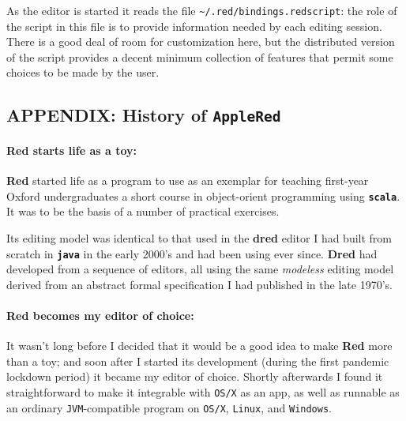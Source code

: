 \documentclass[
]{article}
\begin{document}
As the editor is started it reads the file
\texttt{\textasciitilde{}/.red/bindings.redscript}: the role of the
script in this file is to provide information needed by each editing
session. There is a good deal of room for customization here, but the
distributed version of the script provides a decent minimum collection
of features that permit some choices to be made by the user.

\hypertarget{appendix-history-of-applered}{%
\subsection{\texorpdfstring{APPENDIX: History of
\texttt{AppleRed}}{APPENDIX: History of AppleRed}}\label{appendix-history-of-applered}}

\hypertarget{red-starts-life-as-a-toy}{%
\paragraph{Red starts life as a toy:}\label{red-starts-life-as-a-toy}}

\textbf{Red} started life as a program to use as an exemplar for
teaching first-year Oxford undergraduates a short course in
object-orient programming using \textbf{\texttt{scala}}. It was to be
the basis of a number of practical exercises.

Its editing model was identical to that used in the \textbf{dred} editor
I had built from scratch in \textbf{\texttt{java}} in the early 2000's
and had been using ever since. \textbf{Dred} had developed from a
sequence of editors, all using the same \emph{modeless} editing model
derived from an abstract formal specification I had published in the
late 1970's.

\hypertarget{red-becomes-my-editor-of-choice}{%
\paragraph{Red becomes my editor of
choice:}\label{red-becomes-my-editor-of-choice}}

It wasn't long before I decided that it would be a good idea to make
\textbf{Red} more than a toy; and soon after I started its development
(during the first pandemic lockdown period) it became my editor of
choice. Shortly afterwards I found it straightforward to make it
integrable with \texttt{OS/X} as an app, as well as runnable as an
ordinary \texttt{JVM}-compatible program on \texttt{OS/X},
\texttt{Linux}, and \texttt{Windows}.
\end{document}
